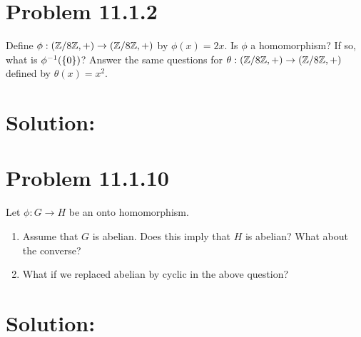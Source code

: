 \documentclass{agstract}
\begin{document}
  \clearpage


  \section*{Problem 11.1.2}
    Define $\phi : (\mathbb{Z}/ 8 \mathbb{Z}, +) \to (\mathbb{Z}/ 8 \mathbb{Z}, +)$ by $\phi(x) = 2x$. Is
    $\phi$ a homomorphism? If so, what is $\phi^{-1}( \left\{ 0 \right\} )$? Answer
    the same questions for $\theta : (\mathbb{Z}/ 8 \mathbb{Z}, +) \to (\mathbb{Z}/ 8 \mathbb{Z}, +)$ defined
    by $\theta(x) = x^2$.

  \hrulefill

  \section*{Solution:}

  \clearpage


  \section*{Problem 11.1.10}
    Let $\phi : G \to H$ be an onto homomorphism.
    \begin{enumerate}
      \item Assume that $G$ is abelian. Does this imply that $H$ is
        abelian? What about the converse?
      \item What if we replaced abelian by cyclic in the above
        question?
    \end{enumerate}

  \hrulefill

  \section*{Solution:}
\end{document}

